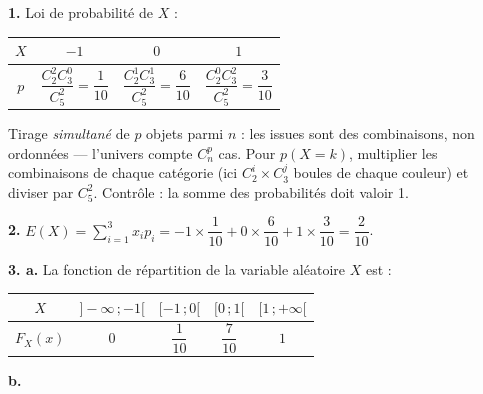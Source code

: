 \documentclass[11pt]{article}
\begin{document}


\textbf{1.} Loi de probabilité de $X$ :
\begin{center}\renewcommand{\arraystretch}{1.8}
\begin{tabular}{|c|c|c|c|}
\hline
$X$ & $-1$ & $0$ & $1$ \\
\hline
$p$ & $\dfrac{C_2^2 C_3^0}{C_5^2} = \dfrac{1}{10}$ & $\dfrac{C_2^1 C_3^1}{C_5^2} = \dfrac{6}{10}$ & $\dfrac{C_2^0 C_3^2}{C_5^2} = \dfrac{3}{10}$ \\
\hline
\end{tabular}
\end{center}

\begin{methode}
Tirage \emph{simultané} de $p$ objets parmi $n$ : les issues sont des
combinaisons, non ordonnées — l'univers compte $C_n^p$ cas. Pour
$p(X = k)$, multiplier les combinaisons de chaque catégorie (ici
$C_2^i \times C_3^j$ boules de chaque couleur) et diviser par $C_5^2$.
Contrôle : la somme des probabilités doit valoir 1.
\end{methode}

\textbf{2.} $E(X) = \displaystyle\sum_{i=1}^{3} x_i p_i = -1 \times \dfrac{1}{10} + 0 \times \dfrac{6}{10} + 1 \times \dfrac{3}{10} = \dfrac{2}{10}$.

\textbf{3. a.} La fonction de répartition de la variable aléatoire $X$ est :
\begin{center}\renewcommand{\arraystretch}{1.8}
\begin{tabular}{|c|c|c|c|c|}
\hline
$X$ & $]-\infty\,;-1[$ & $[-1\,;0[$ & $[0\,;1[$ & $[1\,;+\infty[$ \\
\hline
$F_X(x)$ & $0$ & $\dfrac{1}{10}$ & $\dfrac{7}{10}$ & $1$ \\
\hline
\end{tabular}
\end{center}

\textbf{b.}
\begin{center}
\end{center}
\end{document}
